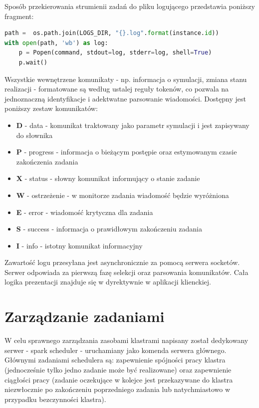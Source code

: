\documentclass[a4paper,onecolumn,oneside,12pt]{memoir}
\begin{document}
{Sposób przekierowania strumienii zadań do pliku logującego przedstawia poniższy fragment:

\begin{lstlisting}[language=Python, caption=Tworzenie logu]
path =  os.path.join(LOGS_DIR, "{}.log".format(instance.id))
with open(path, 'wb') as log:
	p = Popen(command, stdout=log, stderr=log, shell=True)
	p.wait()
\end{lstlisting}

Wszystkie wewnętrzene komunikaty - np. informacja o symulacji, zmiana stanu realizacji -
formatowane są według ustalej reguły tokenów, co pozwala na jednoznaczną identyfikacje
i adektwatne parsowanie wiadomości. Dostępny jest poniższy zestaw komunikatów:
\begin{itemize}
\item \textbf{D} - data - komunikat traktowany jako parametr symulacji i jest zapisywany
do słownika
\item \textbf{P} - progress - informacja o bieżącym postępie oraz estymowanym czasie
zakończenia zadania
\item \textbf{X} - status - słowny komunikat informujący o stanie zadanie
\item \textbf{W} - ostrzeżenie - w monitorze zadania wiadomość będzie wyróżniona
\item \textbf{E} - error - wiadomość krytyczna dla zadania
\item \textbf{S} - success - informacja o prawidłowym zakończeniu zadania
\item \textbf{I} - info - istotny komunikat informacyjny
\end{itemize}

Zawartość logu przesyłana jest asynchronicznie za pomocą serwera socketów. Serwer
odpowiada za pierwszą fazę selekcji oraz parsowania komunikatów. Cała logika prezentacji
znajduje się w dyrektywnie w aplikacji klienckiej.

\section{Zarządzanie zadaniami}
\quad \quad W celu sprawnego zarządzania zasobami klastrami napisany został dedykowany
serwer - spark scheduler - uruchamiany jako komenda serwera głównego. Głównymi zadaniami
schedulera są: zapewnienie spójności pracy klastra (jednocześnie tylko jedno zadanie
może być realizowane) oraz zapewnienie ciągłości pracy (zadanie oczekujące w kolejce
jest przekazywane do klastra niezwłocznie po zakończeniu poprzedniego zadania lub
natychmiastowo w przypadku bezczynności klastra).

}
\end{document}
